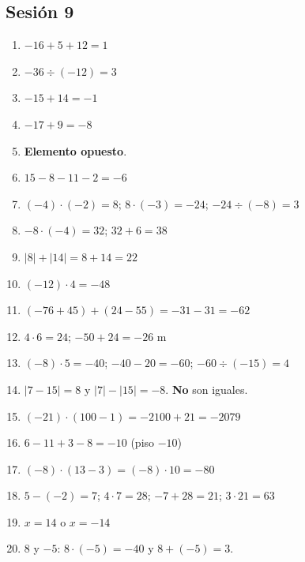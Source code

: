 \documentclass[12pt, letterpaper]{article}
\begin{document}
\subsection*{Sesión 9}
\begin{enumerate}[leftmargin=*, label=\textbf{\arabic*.}]
  \item $-16 + 5 + 12 = 1$
  \item $-36 \div (-12) = 3$
  \item $-15 + 14 = -1$
  \item $-17 + 9 = -8$
  \item \textbf{Elemento opuesto}.
  \item $15 - 8 - 11 - 2 = -6$
  \item $(-4) \cdot (-2) = 8$; $8 \cdot (-3) = -24$; $-24 \div (-8) = 3$
  \item $-8 \cdot (-4) = 32$; $32 + 6 = 38$
  \item $|8| + |14| = 8 + 14 = 22$
  \item $(-12) \cdot 4 = -48$
  \item $(-76 + 45) + (24 - 55) = -31 - 31 = -62$
  \item $4 \cdot 6 = 24$; $-50 + 24 = -26$ m
  \item $(-8) \cdot 5 = -40$; $-40 - 20 = -60$; $-60 \div (-15) = 4$
  \item $|7 - 15| = 8$ y $|7| - |15| = -8$. \textbf{No} son iguales.
  \item $(-21) \cdot (100 - 1) = -2100 + 21 = -2079$
  \item $6 - 11 + 3 - 8 = -10$ (piso $-10$)
  \item $(-8) \cdot (13 - 3) = (-8) \cdot 10 = -80$
  \item $5 - (-2) = 7$; $4 \cdot 7 = 28$; $-7 + 28 = 21$; $3 \cdot 21 = 63$
  \item $x = 14$ o $x = -14$
  \item $8$ y $-5$: $8 \cdot (-5) = -40$ y $8 + (-5) = 3$.
\end{enumerate}
\end{document}
